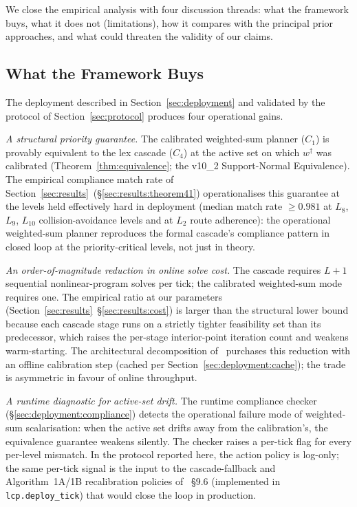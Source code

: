 
We close the empirical analysis with four discussion threads: what the framework buys, what it does not (limitations), how it compares with the principal prior approaches, and what could threaten the validity of our claims.

\subsection{What the Framework Buys}
\label{sec:discussion:buys}

The deployment described in Section~\ref{sec:deployment} and validated by the protocol of Section~\ref{sec:protocol} produces four operational gains.

\emph{A structural priority guarantee.} The calibrated weighted-sum planner ($C_1$) is provably equivalent to the lex cascade ($C_4$) at the active set on which $w^{\dagger}$ was calibrated (Theorem~\ref{thm:equivalence}; the v10\_2 Support-Normal Equivalence). The empirical compliance match rate of Section~\ref{sec:results}~(\S\ref{sec:results:theorem41}) operationalises this guarantee at the levels held effectively hard in deployment (median match rate $\geq 0.981$ at $L_8$, $L_9$, $L_{10}$ collision-avoidance levels and at $L_2$ route adherence): the operational weighted-sum planner reproduces the formal cascade's compliance pattern in closed loop at the priority-critical levels, not just in theory.

\emph{An order-of-magnitude reduction in online solve cost.} The cascade requires $L + 1$ sequential nonlinear-program solves per tick; the calibrated weighted-sum mode requires one. The empirical ratio at our parameters (Section~\ref{sec:results}~\S\ref{sec:results:cost}) is larger than the structural lower bound because each cascade stage runs on a strictly tighter feasibility set than its predecessor, which raises the per-stage interior-point iteration count and weakens warm-starting. The architectural decomposition of~\cite{lcp2025} purchases this reduction with an offline calibration step (cached per Section~\ref{sec:deployment:cache}); the trade is asymmetric in favour of online throughput.

\emph{A runtime diagnostic for active-set drift.} The runtime compliance checker (\S\ref{sec:deployment:compliance}) detects the operational failure mode of weighted-sum scalarisation: when the active set drifts away from the calibration's, the equivalence guarantee weakens silently. The checker raises a per-tick flag for every per-level mismatch. In the protocol reported here, the action policy is log-only; the same per-tick signal is the input to the cascade-fallback and Algorithm~1A/1B recalibration policies of \cite{lcp2025}~\S9.6 (implemented in \texttt{lcp.deploy\_tick}) that would close the loop in production.

